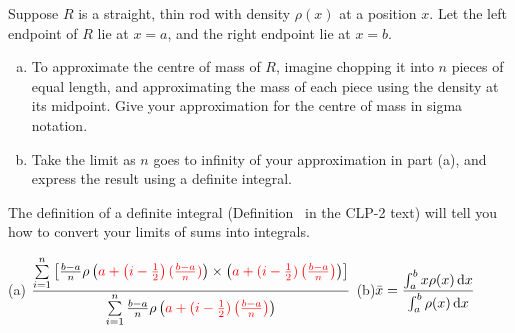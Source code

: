 \begin{Mquestion}\label{prob_s2.3:rod}
Suppose  $R$ is a straight, thin rod with density $\rho(x)$ at a position $x$. Let the left endpoint of $R$ lie at $x=a$, and the right endpoint lie at $x=b$.

\begin{enumerate}[(a)]
\item To approximate the centre of mass of $R$, imagine chopping it into $n$ pieces of equal length, and approximating the mass of each piece using the density at its midpoint.  Give your approximation for the centre of mass in sigma notation.
\begin{center}
\end{center}
\item \label{prob_s2.3:rodb}Take the limit as $n$ goes to infinity of your approximation in part (a), and express the result using a definite integral.
\end{enumerate}
\end{Mquestion}
\begin{hint}
The definition of a definite integral (Definition~ in the CLP-2 text) will tell you how to convert your limits of sums into integrals.
\end{hint}
\begin{answer}
(a) \quad$\displaystyle\frac{\sum\limits_{i=1}^n\left[\frac{b-a}{n}\rho\left(\textcolor{red}{a+\left(i-\tfrac12\right)(\tfrac{b-a}{n})}\right)\times\left(
\textcolor{red}{
a+(i-\tfrac12)\left(\tfrac{b-a}{n}\right)
}
\right)\right]}{\sum\limits_{i=1}^n\frac{b-a}{n}\rho\left(\textcolor{red}{
a+(i-\tfrac12)\left(\tfrac{b-a}{n}\right)
}
\right)}$\qquad
(b)\quad $\displaystyle\bar x=\frac{\int_a^b x\rho(x)\,\mathrm{d}x}{\int_a^b\rho(x)\,\mathrm{d}x}$
\end{answer}

